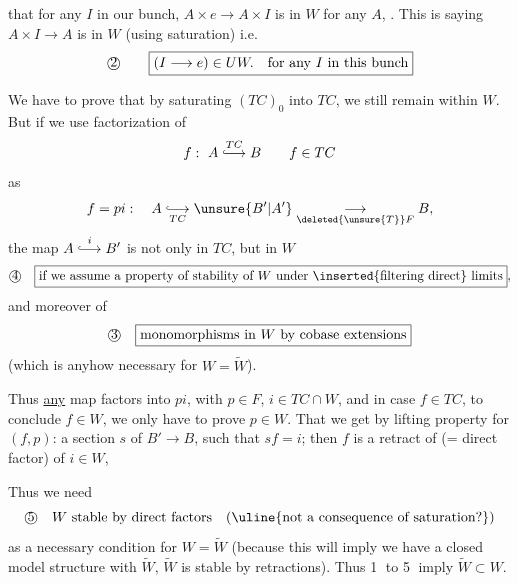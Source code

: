 
 that for any  $I$   in our bunch,
$A\times e\longrightarrow A\times I$ is in $W$ for any $A$, .
This is   saying $A\times I\longrightarrow A$ is in $W$ (using saturation) i.e.
\[
\text{\textcircled{2}}\qquad\boxed{(I\longrightarrow e)\in UW.\quad\text{for any }I\text{ in this bunch}}
\]

We have to prove that by saturating $(TC)_0$ into $TC$, we still remain within $W$. But if we use factorization of
\[
f:\ A\overset{TC}{\lhook\joinrel\longrightarrow}B\qquad f\in TC
\]
as
\[
f=pi:\quad A\underset{TC}{\lhook\joinrel\longrightarrow}\unsure{B'|A'}\underset{\deleted{\unsure{T}}F}{\longrightarrow}B,
\]
the map $A\overset{i}{\lhook\joinrel\longrightarrow}B'$ is not only in $TC$, but  in $W$
\[
\text{\textcircled{4}}\quad\boxed{\text{if we assume a property of stability of }W\text{ under \inserted{filtering direct} limits}},
\]
and moreover  of 
\[
\text{\textcircled{3}}\quad\boxed{\text{monomorphisms in }W\text{ by cobase extensions}}
\]
(which is anyhow necessary for $W=\widetilde W$). 

Thus \uline{any} map  factors into $pi$, with $p\in F$, $i\in TC\cap W$, and in case $f\in TC$, to conclude $f\in W$, we only have to prove $p\in W$. That we get by lifting property for $(f,p)$: a section $s$ of $B'\longrightarrow B$, such that $sf=i$; then $f$ is a retract of (= direct factor) of $i\in W$,

Thus we need 
\[
\text{\textcircled{5}}\quad W\text{ stable by direct factors}\quad(\text{\uline{not a consequence of saturation?}})
\]
as a necessary condition for $W=\widetilde W$ (because this will imply we have a closed model structure with $\widetilde W$,  $\widetilde W$ is stable by retractions). Thus \textcircled{1} to \textcircled{5} imply $\widetilde W\subset W$.

